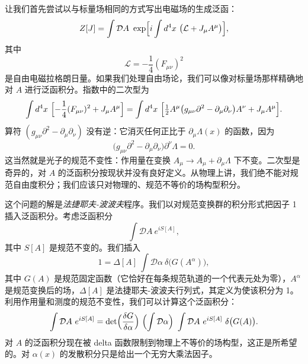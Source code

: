 让我们首先尝试以与标量场相同的方式写出电磁场的生成泛函：
\begin{equation}
  Z[J] = \int \mathcal{D}A\ \exp\Bigl[ i\int d^4x\ \bigl(
    \mathcal{L} + J_\mu A^\mu \bigr) \Bigr] ,
  \label{eq:9.47}
\end{equation}
其中
\begin{equation}
  \mathcal{L} = -\frac{1}{4}(F_{\mu\nu})^2
\end{equation}
是自由电磁拉格朗日量。如果我们处理自由场论，我们可以像对标量场那样精确地对 $A$ 进行泛函积分。指数中的二次型为
\begin{equation}
  \int d^4x\ \Bigl[ -\frac{1}{4}(F_{\mu\nu})^2 + J_\mu A^\mu \Bigr]
  = \int d^4x\ \Bigl[ \tfrac{1}{2}A^\mu\bigl( g_{\mu\nu}\partial^2
    - \partial_\mu\partial_\nu \bigr)A^\nu + J_\mu A^\mu \Bigr] .
  \label{eq:9.52}
\end{equation}
算符 $(g_{\mu\nu}\partial^2 - \partial_\mu\partial_\nu)$ 没有逆：它消灭任何正比于 $\partial_\mu\Lambda(x)$ 的函数，因为
\begin{equation}
  \bigl( g_{\mu\nu}\partial^2 - \partial_\mu\partial_\nu \bigr)
    \partial^\nu\Lambda = 0 .
\end{equation}
这当然就是光子的规范不变性：作用量在变换 $A_\mu\to A_\mu + \partial_\mu\Lambda$ 下不变。二次型是奇异的，对 $A$ 的泛函积分按现状并没有良好定义。从物理上讲，我们绝不能对规范自由度积分；我们应该只对物理的、规范不等价的场构型积分。

这个问题的解是\emph{法捷耶夫-波波夫}程序。我们以对规范变换群的积分形式把因子 1 插入泛函积分。考虑泛函积分
\begin{equation}
  \int \mathcal{D}A\ e^{iS[A]} ,
\end{equation}
其中 $S[A]$ 是规范不变的。我们插入
\begin{equation}
  1 = \Delta[A]\ \int \mathcal{D}\alpha\ \delta\bigl( G(A^\alpha) \bigr) ,
  \label{eq:9.53}
\end{equation}
其中 $G(A)$ 是规范固定函数（它恰好在每条规范轨道的一个代表元处为零），$A^\alpha$ 是规范变换后的场，$\Delta[A]$ 是法捷耶夫-波波夫行列式，其定义为使该积分为 1。利用作用量和测度的规范不变性，我们可以计算这个泛函积分：
\begin{equation}
  \int \mathcal{D}A\ e^{iS[A]} = \det\Bigl( \frac{\delta G}{\delta\alpha}
    \Bigr)\ \Bigl( \int \mathcal{D}\alpha \Bigr)\
    \int \mathcal{D}A\ e^{iS[A]}\ \delta\bigl( G(A) \bigr) .
  \label{eq:9.54}
\end{equation}
对 $A$ 的泛函积分现在被 delta 函数限制到物理上不等价的场构型，这正是所希望的。对 $\alpha(x)$ 的发散积分只是给出一个无穷大乘法因子。

